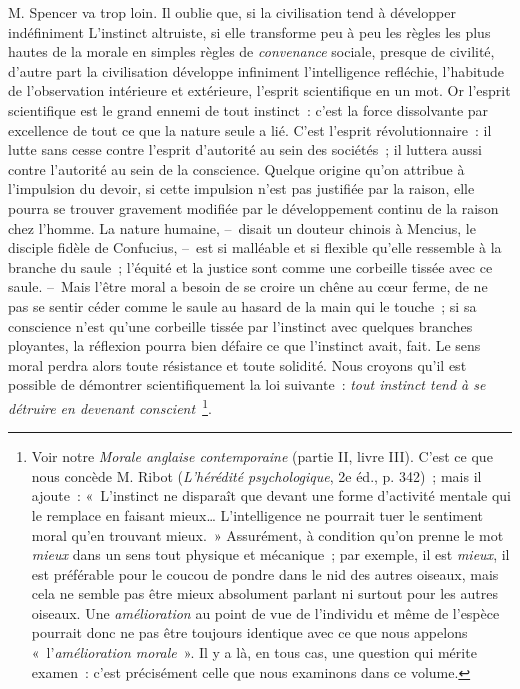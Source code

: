 \documentclass[french,twoside]{book} %
\begin{document}
M. Spencer va trop loin. Il oublie que, si la civilisation tend à développer indéfiniment L’instinct altruiste, si elle transforme peu à peu les règles les plus hautes de la morale en simples règles de \emph{convenance} sociale, presque de civilité, d’autre part la civilisation développe infiniment l’intelligence refléchie, l’habitude de l’observation intérieure et extérieure, l’esprit scientifique en un mot. Or l’esprit scientifique est le grand ennemi de tout instinct : c’est la force dissolvante par excellence de tout ce que la nature seule a lié. C’est l’esprit révolutionnaire : il lutte sans cesse contre l’esprit d’autorité au sein des sociétés ; il luttera aussi contre l’autorité au sein de la conscience. Quelque origine qu’on attribue à l’impulsion du devoir, si cette impulsion n’est pas justifiée par la raison, elle pourra se trouver gravement modifiée par le développement continu de la raison chez l’homme. La nature humaine, – disait un douteur chinois à Mencius, le disciple fidèle de Confucius, – est si malléable et si flexible qu’elle ressemble à la branche du saule ; l’équité et la justice sont comme une corbeille tissée avec ce saule. – Mais l’être moral a besoin de se croire un chêne au cœur ferme, de ne pas se sentir céder comme le saule au hasard de la main qui le touche ; si sa conscience n’est qu’une corbeille tissée par l’instinct avec quelques branches ployantes, la réflexion pourra bien défaire ce que l’instinct avait, fait. Le sens moral perdra alors toute résistance et toute solidité. Nous croyons qu’il est possible de démontrer scientifiquement la loi suivante : \emph{tout instinct tend à se détruire en devenant conscient} \footnote{Voir notre \emph{Morale anglaise contemporaine} (partie II, livre III). C’est ce que nous concède M. Ribot (\emph{L’hérédité psychologique}, 2e éd., p. 342) ; mais il ajoute : « L’instinct ne disparaît que devant une forme d’activité mentale qui le remplace en faisant mieux… L’intelligence ne pourrait tuer le sentiment moral qu’en trouvant mieux. » Assurément, à condition qu’on prenne le mot \emph{mieux} dans un sens tout physique et mécanique ; par exemple, il est \emph{mieux}, il est préférable pour le coucou de pondre dans le nid des autres oiseaux, mais cela ne semble pas être mieux absolument parlant ni surtout pour les autres oiseaux. Une \emph{amélioration} au point de vue de l’individu et même de l’espèce pourrait donc ne pas être toujours identique avec ce que nous appelons « l’\emph{amélioration morale} ». Il y a là, en tous cas, une question qui mérite examen : c’est précisément celle que nous examinons dans ce volume.}.\par
\end{document}
